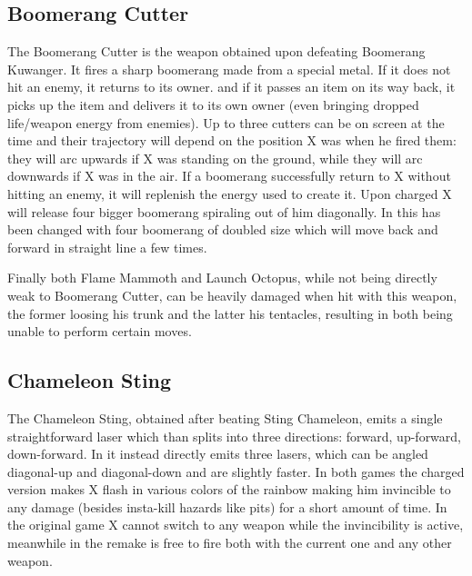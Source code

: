 \subsection{Boomerang Cutter}\label{Boomerang_cutter}
The Boomerang Cutter is the weapon obtained upon defeating Boomerang Kuwanger. It fires a sharp boomerang made from a special metal. If it does not hit an enemy, it returns to its owner. and if it passes an item on its way back, it picks up the	item and delivers it to its own owner (even bringing dropped life/weapon energy from enemies). Up to three cutters can be on screen at the time\cite{wiki:Boomerang_cutter} and their trajectory will depend on the position X was when he fired them: they will arc upwards if X was standing on the ground, while they will arc downwards if X was in the air. If a boomerang successfully return to X without hitting an enemy, it will replenish the energy used to create it. Upon charged X will release four bigger boomerang spiraling out of him diagonally. In \mhx this has been changed with four boomerang of doubled size which will move back and forward in straight line a few times. 

Finally both Flame Mammoth and Launch Octopus, while not being directly weak to Boomerang Cutter, can be heavily damaged when hit with this weapon, the former loosing his trunk and the latter his tentacles, resulting in both being unable to perform certain moves.

\subsection{Chameleon Sting}\label{Chameleon_sting}
The Chameleon Sting, obtained after beating Sting Chameleon, emits a single straightforward laser which than splits into three directions: forward, up-forward, down-forward. In \mhx it instead directly emits three lasers, which can be angled diagonal-up and diagonal-down and are slightly faster. In both games the charged version makes X flash in various colors of the rainbow making him invincible to any damage (besides insta-kill hazards like pits) for a short amount of time. In the original game X cannot switch to any weapon while the invincibility is active, meanwhile in the remake is free to fire both with the current one and any other weapon\cite{wiki:Chameleon_sting}.

